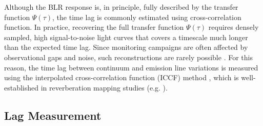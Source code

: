 Although the BLR response is, in principle, fully described by the transfer function $\Psi(\tau)$, the time lag is commonly estimated using cross-correlation function. In practice, recovering the full transfer function $\Psi\left(\tau\right)$ requires densely sampled, high signal-to-noise light curves that covers a timescale much longer than the expected time lag. Since monitoring campaigns are often affected by observational gaps and noise, such reconstructions are rarely possible \parencite{horne2004observational,peterson1993}. For this reason, the time lag between continuum and emission line variations is measured using the interpolated cross-correlation function (ICCF) method \parencite{gaskell_peterson1986}, which is well-established in reverberation mapping studies (e.g. \cite{kollatschny1997balmer,denney2006ngc4593,Williams_2018,probst2025emissionlinecontinuumreverberationmapping}).\\


\subsection{Lag Measurement}
\label{subsec:rm_ccf}

